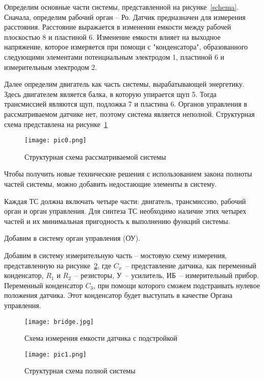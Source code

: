 
Определим основные части системы, представленной на рисунке~\ref{schema}. Сначала, определим рабочий орган -- Ро. Датчик предназначен для измерения расстояния. Расстояние выражается в изменении емкости между рабочей плоскостью 8 и пластиной 6. Изменение емкости влияет на выходное напряжение, которое измеряется при помощи с "конденсатора", образованного следующими элементами потенциальным электродом 1, пластиной 6 и измерительным электродом 2. 

Далее определим двигатель как часть системы, вырабатывающей энергетику. Здесь двигателем является балка, в которую упирается щуп 5. Тогда трансмиссией являются щуп, подложка 7 и пластина 6. Органов управления в рассматриваемом датчике нет, поэтому система является неполной. Структурная схема представлена на рисунке~\ref{first_sys}

\begin{figure}[h]
	\centering
	\texttt{[image: pic0.png]}
	\caption{Структурная схема рассматриваемой системы}
	\label{first_sys}
\end{figure}

Чтобы получить новые технические решения с использованием закона полноты частей  системы, можно добавить недостающие элементы в систему. 

Каждая ТС должна включать четыре части: двигатель, трансмиссию, рабочий орган и орган управления. Для синтеза ТС необходимо наличие этих четырех частей и их минимальная пригодность к выполнению функций системы.

Добавим в систему орган управления (ОУ).

Добавим в систему измерительную часть -- мостовую схему измерения, представленную на рисунке~\ref{im:bridge}, где $C_x$~-- представление датчика, как переменный конденсатор, $R_1$ и $R_2$~-- резисторы, У~-- усилитель, ИБ~-- измерительный прибор. Переменный конденсатор $C_3$, при помощи которого сможем подстраивать нулевое положения датчика. Этот конденсатор будет выступать в качестве Органа управления.


\begin{figure}[h]
	\centering
	\texttt{[image: bridge.jpg]}
	\caption{Схема измерения емкости датчика с подстройкой}
	\label{im:bridge}
\end{figure}


\begin{figure}[h!]
	\centering
	\texttt{[image: pic1.png]}
	\caption{Структурная схема полной системы}
	\label{pic1}
\end{figure}

